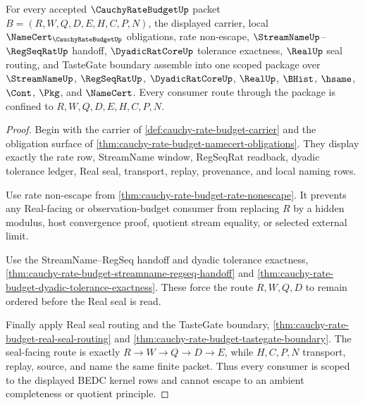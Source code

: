 \begin{theorem}
\label{thm:cauchy-rate-budget-scope-package}
For every accepted $\CauchyRateBudgetUp$ packet $B=(R,W,Q,D,E,H,C,P,N)$, the displayed carrier, local $\NameCert_{\CauchyRateBudgetUp}$ obligations, rate non-escape, $\StreamNameUp$--$\RegSeqRatUp$ handoff, $\DyadicRatCoreUp$ tolerance exactness, $\RealUp$ seal routing, and TasteGate boundary assemble into one scoped package over $\StreamNameUp$, $\RegSeqRatUp$, $\DyadicRatCoreUp$, $\RealUp$, $\BHist$, $\hsame$, $\Cont$, $\Pkg$, and $\NameCert$. Every consumer route through the package is confined to $R,W,Q,D,E,H,C,P,N$.
\end{theorem}
\begin{proof}
Begin with the carrier of \autoref{def:cauchy-rate-budget-carrier} and the obligation surface of \autoref{thm:cauchy-rate-budget-namecert-obligations}. They display exactly the rate row, StreamName window, RegSeqRat readback, dyadic tolerance ledger, Real seal, transport, replay, provenance, and local naming rows.

Use rate non-escape from \autoref{thm:cauchy-rate-budget-rate-nonescape}. It prevents any Real-facing or observation-budget consumer from replacing $R$ by a hidden modulus, host convergence proof, quotient stream equality, or selected external limit.

Use the StreamName--RegSeq handoff and dyadic tolerance exactness, \autoref{thm:cauchy-rate-budget-streamname-regseq-handoff} and \autoref{thm:cauchy-rate-budget-dyadic-tolerance-exactness}. These force the route $R,W,Q,D$ to remain ordered before the Real seal is read.

Finally apply Real seal routing and the TasteGate boundary, \autoref{thm:cauchy-rate-budget-real-seal-routing} and \autoref{thm:cauchy-rate-budget-tastegate-boundary}. The seal-facing route is exactly $R \to W \to Q \to D \to E$, while $H,C,P,N$ transport, replay, source, and name the same finite packet. Thus every consumer is scoped to the displayed BEDC kernel rows and cannot escape to an ambient completeness or quotient principle.
\end{proof}

